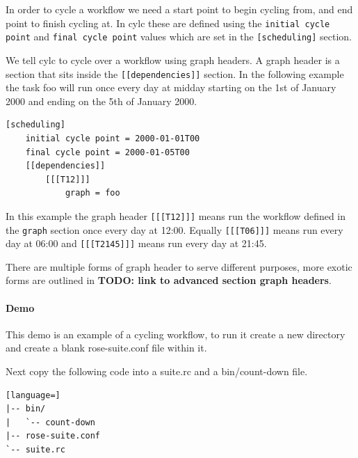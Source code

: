 In order to cycle a workflow we need a start point to begin cycling from, and
end point to finish cycling at. In cylc these are defined using the
\lstinline=initial cycle point= and \lstinline=final cycle point= values which
are set in the \lstinline=[scheduling]= section.

We tell cylc to cycle over a workflow using graph headers. A graph header is a
section that sits inside the \lstinline=[[dependencies]]= section. In the
following example the task foo will run once every day at midday starting on
the 1st of January 2000 and ending on the 5th of January 2000.

\begin{lstlisting}[language=suiterc]
[scheduling]
    initial cycle point = 2000-01-01T00
    final cycle point = 2000-01-05T00
    [[dependencies]]
        [[[T12]]]
            graph = foo
\end{lstlisting}

In this example the graph header \lstinline=[[[T12]]]= means run the workflow
defined in the \lstinline=graph= section once every day at 12:00. Equally
\lstinline=[[[T06]]]= means run every day at 06:00 and \lstinline=[[[T2145]]]=
means run every day at 21:45.


There are multiple forms of graph header to serve different purposes, more
exotic forms are outlined in \textbf{TODO: link to advanced section graph
headers}.

\paragraph*{Demo}
This demo is an example of a cycling workflow, to run it create a new
directory and create a blank rose-suite.conf file within it.

Next copy the following code into a suite.rc and a bin/count-down file.

\begin{lstlisting}[language=]
|-- bin/
|   `-- count-down
|-- rose-suite.conf
`-- suite.rc
\end{lstlisting}

